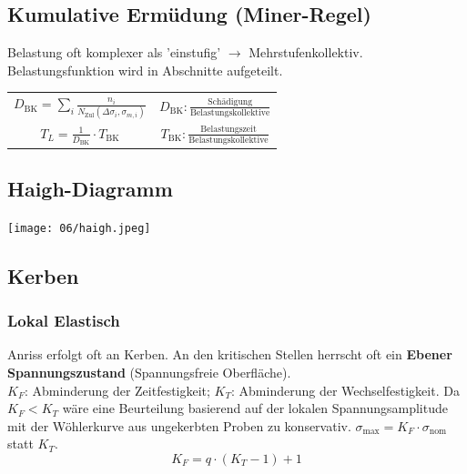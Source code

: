     \subsection{Kumulative Ermüdung (Miner-Regel)}
        Belastung oft komplexer als 'einstufig' $\rightarrow$ Mehrstufenkollektiv. Belastungsfunktion wird in Abschnitte aufgeteilt.
        \vspace{-2mm}
        \begin{center}
            \begin{tabular}{c c}
                $\boxed{D_{\textrm{BK}}= \sum_{i}\frac{n_{i}}{N_{\textrm{Zul}}(\Delta\sigma_{i},\sigma_{m,i})}}$ & $D_{\textrm{BK}}: \frac{\textrm{Schädigung}}{\textrm{Belastungskollektive}}$ \\
                $\boxed{T_{L}=\frac{1}{D_{\textrm{BK}}}\cdot T_{\textrm{BK}}}$ & $T_{\textrm{BK}}:\frac{\textrm{Belastungszeit}}{\textrm{Belastungskollektive}}$
            \end{tabular}
        \end{center}

    \subsection{Haigh-Diagramm}
        \begin{center}
            \texttt{[image: 06/haigh.jpeg]}
        \end{center}
        
    \subsection{Kerben}
        \subsubsection{Lokal Elastisch}
            Anriss erfolgt oft an Kerben. An den kritischen Stellen herrscht oft ein \textbf{Ebener Spannungszustand} (Spannungsfreie Oberfläche).\\ $K_F$: Abminderung der Zeitfestigkeit; $K_T$: Abminderung der Wechselfestigkeit. Da $K_F < K_T$ wäre eine Beurteilung basierend auf der lokalen Spannungsamplitude mit der Wöhlerkurve aus ungekerbten Proben zu konservativ. $\sigma_{\textrm{max}}=K_F \cdot \sigma_{\textrm{nom}}$ statt $K_T$.
            \[\boxed{K_F = q\cdot(K_T-1)+1}\]
